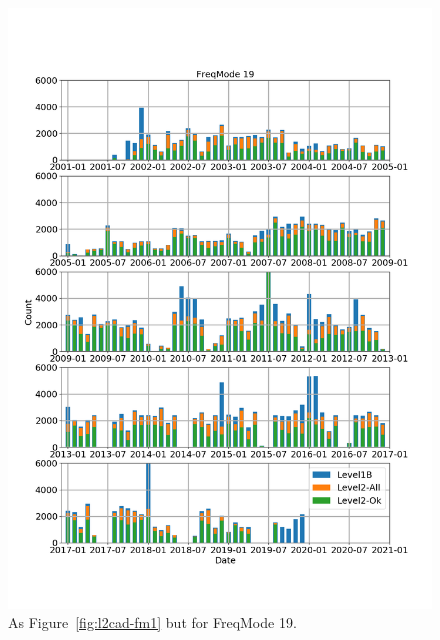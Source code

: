 \begin{figure}[t]
\centering
\includegraphics[width=1.0\textwidth]{l2cad-fm19.png}
\caption{As Figure~\ref{fig:l2cad-fm1} but for FreqMode 19.}
\label{fig:l2cad-fm19}
\end{figure}

